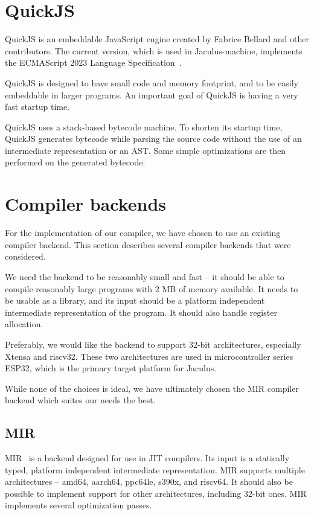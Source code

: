 \section{QuickJS}

QuickJS \cite{quickjs} is an embeddable JavaScript engine created by Fabrice Bellard and other contributors. The current version, which is used in Jaculus-machine, implements the ECMAScript 2023 Language Specification~\cite{ecma262}.

QuickJS is designed to have small code and memory footprint, and to be easily embeddable in larger programs. An important goal of QuickJS is having a very fast startup time.

QuickJS uses a stack-based bytecode machine. To shorten its startup time, QuickJS generates bytecode while parsing the source code without the use of an intermediate representation or an AST. Some simple optimizations are then performed on the generated bytecode.


\section{Compiler backends}

For the implementation of our compiler, we have chosen to use an existing compiler backend. This section describes several compiler backends that were considered.

We need the backend to be reasonably small and fast -- it should be able to compile reasonably large programs with 2 MB of memory available. It needs to be usable as a library, and its input should be a platform independent intermediate representation of the program. It should also handle register allocation.

Preferably, we would like the backend to support 32-bit architectures, especially Xtensa and riscv32. These two architectures are used in microcontroller series ESP32, which is the primary target platform for Jaculus.

While none of the choices is ideal, we have ultimately chosen the MIR compiler backend which suites our needs the best.


\subsection{MIR}

MIR~\cite{mir} is a backend designed for use in JIT compilers. Its input is a statically typed, platform independent intermediate representation. MIR supports multiple architectures -- amd64, aarch64, ppc64le, s390x, and riscv64. It should also be possible to implement support for other architectures, including 32-bit ones. MIR implements several optimization passes.

